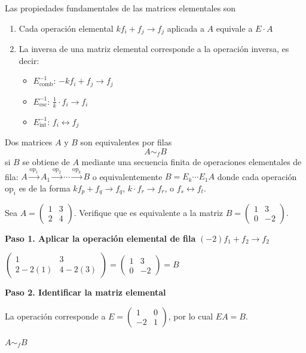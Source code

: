 \begin{theorem} Las propiedades fundamentales de las matrices elementales son
\begin{enumerate}

\item Cada operación elemental $k f_i + f_j \to f_j$ aplicada a $A$ equivale a $E \cdot A$
\item La inversa de una matriz elemental corresponde a la operación inversa, es decir:
  \begin{itemize}
  \item $E_{\text{comb}}^{-1}$: $-k f_i + f_j \to f_j$
  \item $E_{\text{esc}}^{-1}$: $\frac{1}{k} \cdot f_i \to f_i$
  \item $E_{\text{int}}^{-1}$: $f_i \leftrightarrow f_j$
  \end{itemize}
\end{enumerate}
\end{theorem}

\begin{definition}
Dos matrices $A$ y $B$ son equivalentes por filas $$A \sim_f B$$ si $B$ se obtiene de $A$ mediante una secuencia finita de operaciones elementales de fila:
\(A \xrightarrow{\text{op}_1} A_1 \xrightarrow{\text{op}_2} \cdots \xrightarrow{\text{op}_k} B \)  o equivalentemente \( B = E_k \cdots E_1 A
\)
donde cada  operación $\text{op}_i$ es de la forma $k f_p + f_q \to f_q$, $k \cdot f_r \to f_r$, o $f_s \leftrightarrow f_t$.
\end{definition}

\begin{example}\label{ex:equiv}
Sea $A = \begin{pmatrix} 1 & 3 \\ 2 & 4 \end{pmatrix}$. Verifique que es equivalente a la matriz $B = \begin{pmatrix} 1 & 3 \\ 0 & -2 \end{pmatrix}$.
\begin{myproof}
\textbf{Paso 1. Aplicar la operación elemental de fila} $(-2)f_1 + f_2 \to f_2$

$\begin{pmatrix} 1 & 3 \\ 2-2(1) & 4-2(3) \end{pmatrix} = \begin{pmatrix} 1 & 3 \\ 0 & -2 \end{pmatrix} = B$

\textbf{Paso 2. Identificar la matriz elemental}

La operación corresponde a $E = \begin{pmatrix} 1 & 0 \\ -2 & 1 \end{pmatrix}$, por lo cual $EA = B$.

$\boxed{A \sim_f B}$
\end{myproof}
\end{example}

